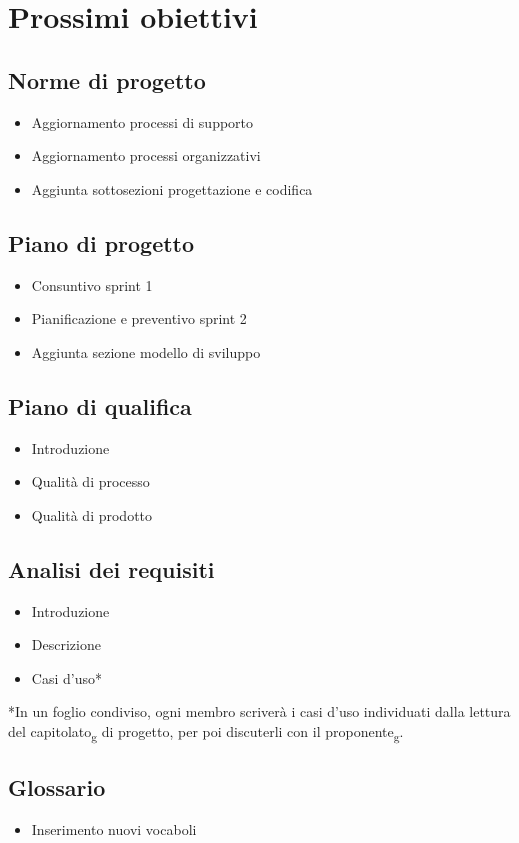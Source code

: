 \section{Prossimi obiettivi}
        \subsection{Norme di progetto}
            \begin{itemize}
                \item Aggiornamento processi di supporto
                \item Aggiornamento processi organizzativi
                \item Aggiunta sottosezioni progettazione e codifica
            \end{itemize}
        \subsection{Piano di progetto}
            \begin{itemize}
                \item Consuntivo sprint 1
                \item Pianificazione e preventivo sprint 2
                \item Aggiunta sezione modello di sviluppo
            \end{itemize}
        \subsection{Piano di qualifica}
            \begin{itemize}
                \item Introduzione
                \item Qualità di processo
                \item Qualità di prodotto
            \end{itemize}
        \subsection{Analisi dei requisiti}
            \begin{itemize}
                \item Introduzione
                \item Descrizione
                \item Casi d'uso* 
            \end{itemize}   
            \begin{small}*In un foglio condiviso, ogni membro scriverà i casi d'uso 
            individuati dalla lettura del capitolato\textsubscript{g} di progetto, 
            per poi discuterli con il proponente\textsubscript{g}.
            \end{small} 
        \subsection{Glossario}
            \begin{itemize}
                \item Inserimento nuovi vocaboli
            \end{itemize}
        